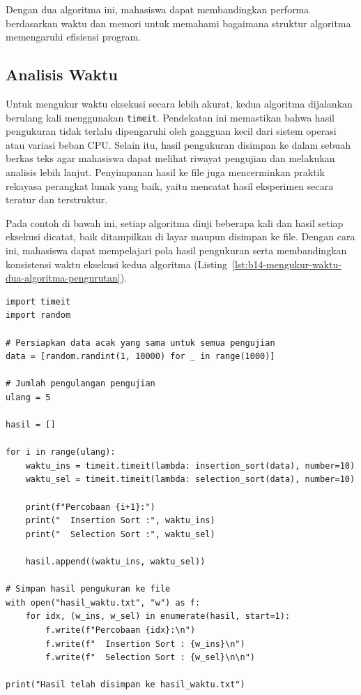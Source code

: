 Dengan dua algoritma ini, mahasiswa dapat membandingkan performa berdasarkan waktu dan memori untuk memahami bagaimana struktur algoritma memengaruhi efisiensi program.

\subsection{Analisis Waktu}

Untuk mengukur waktu eksekusi secara lebih akurat, kedua algoritma dijalankan berulang kali menggunakan \texttt{timeit}. Pendekatan ini memastikan bahwa hasil pengukuran tidak terlalu dipengaruhi oleh gangguan kecil dari sistem operasi atau variasi beban CPU. Selain itu, hasil pengukuran disimpan ke dalam sebuah berkas teks agar mahasiswa dapat melihat riwayat pengujian dan melakukan analisis lebih lanjut. Penyimpanan hasil ke file juga mencerminkan praktik rekayasa perangkat lunak yang baik, yaitu mencatat hasil eksperimen secara teratur dan terstruktur.

Pada contoh di bawah ini, setiap algoritma diuji beberapa kali dan hasil setiap eksekusi dicatat, baik ditampilkan di layar maupun disimpan ke file. Dengan cara ini, mahasiswa dapat mempelajari pola hasil pengukuran serta membandingkan konsistensi waktu eksekusi kedua algoritma (Listing~\ref{lst:b14-mengukur-waktu-dua-algoritma-pengurutan}).

\begin{lstlisting}[style=PythonStyle, caption={Mengukur waktu dua algoritma pengurutan}, label={lst:b14-mengukur-waktu-dua-algoritma-pengurutan}]
import timeit
import random

# Persiapkan data acak yang sama untuk semua pengujian
data = [random.randint(1, 10000) for _ in range(1000)]

# Jumlah pengulangan pengujian
ulang = 5

hasil = []

for i in range(ulang):
    waktu_ins = timeit.timeit(lambda: insertion_sort(data), number=10)
    waktu_sel = timeit.timeit(lambda: selection_sort(data), number=10)

    print(f"Percobaan {i+1}:")
    print("  Insertion Sort :", waktu_ins)
    print("  Selection Sort :", waktu_sel)

    hasil.append((waktu_ins, waktu_sel))

# Simpan hasil pengukuran ke file
with open("hasil_waktu.txt", "w") as f:
    for idx, (w_ins, w_sel) in enumerate(hasil, start=1):
        f.write(f"Percobaan {idx}:\n")
        f.write(f"  Insertion Sort : {w_ins}\n")
        f.write(f"  Selection Sort : {w_sel}\n\n")

print("Hasil telah disimpan ke hasil_waktu.txt")
\end{lstlisting}

